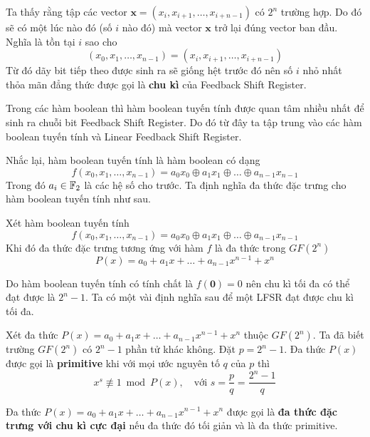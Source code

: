 Ta thấy rằng tập các vector $\bm{x} = (x_i, x_{i+1}, \ldots, x_{i+n-1})$ có $2^n$ trường hợp. Do đó sẽ có một lúc nào đó (số $i$ nào đó) mà vector $\bm{x}$ trở lại đúng vector ban đầu. Nghĩa là tồn tại $i$ sao cho \[(x_0, x_1, \ldots, x_{n-1}) = (x_i, x_{i+1}, \ldots, x_{i+n-1})\] Từ đó dãy bit tiếp theo được sinh ra sẽ giống hệt trước đó nên số $i$ nhỏ nhất thỏa mãn đẳng thức được gọi là \textbf{chu kì} của Feedback Shift Register.

Trong các hàm boolean thì hàm boolean tuyến tính được quan tâm nhiều nhất để sinh ra chuỗi bit Feedback Shift Register. Do đó từ đây ta tập trung vào các hàm boolean tuyến tính và Linear Feedback Shift Register.

Nhắc lại, hàm boolean tuyến tính là hàm boolean có dạng
\begin{equation*}
	f(x_0, x_1, \ldots, x_{n-1}) = a_0 x_0 \oplus a_1 x_1 \oplus \ldots \oplus a_{n-1} x_{n-1}
\end{equation*}
Trong đó $a_i \in \mathbb{F}_2$ là các hệ số cho trước. Ta định nghĩa đa thức đặc trưng cho hàm boolean tuyến tính như sau.

\begin{definition}
	Xét hàm boolean tuyến tính \[f(x_0, x_1, \ldots, x_{n-1}) = a_0 x_0 \oplus a_1 x_1 \oplus \ldots \oplus a_{n-1} x_{n-1}\] Khi đó đa thức đặc trưng tương ứng với hàm $f$ là đa thức trong $GF(2^n)$
	\begin{equation}
		P(x) = a_0 + a_1 x + \ldots + a_{n-1} x^{n-1} + x^n
	\end{equation}
\end{definition}

Do hàm boolean tuyến tính có tính chất là $f(\bm{0}) = 0$ nên chu kì tối đa có thể đạt được là $2^n - 1$. Ta có một vài định nghĩa sau để một LFSR đạt được chu kì tối đa.

\begin{definition}
	Xét đa thức $P(x) = a_0 + a_1 x + \ldots + a_{n-1} x^{n-1} + x^n$ thuộc $GF(2^n)$. Ta đã biết trường $GF(2^n)$ có $2^n - 1$ phần tử khác không. Đặt $p = 2^n - 1$. Đa thức $P(x)$ được gọi là \textbf{primitive} khi với mọi ước nguyên tố $q$ của $p$ thì 
	\begin{equation*}
		x^s \not\equiv 1 \bmod{P(x)}, \quad \text{với } s = \frac{p}{q} = \frac{2^n - 1}{q}
	\end{equation*}
\end{definition}

\begin{definition}
	Đa thức $P(x) = a_0 + a_1 x + \ldots + a_{n-1} x^{n-1} + x^n$ được gọi là \textbf{đa thức đặc trưng với chu kì cực đại} nếu đa thức đó tối giản và là đa thức primitive. 
\end{definition}

